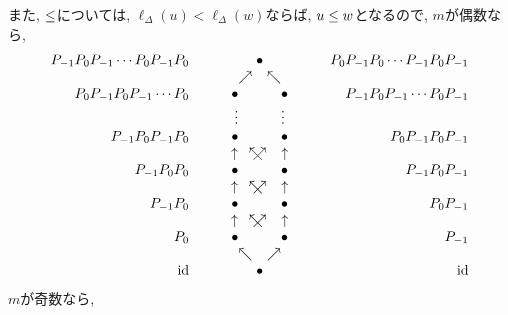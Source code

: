\newcommand{\xarrow}{\makebox[0pt][l]{$\nwarrow$}\nearrow}
また, $\mathrel{\leq}$については, $\ell_\Delta(u)<\ell_\Delta(w)$ならば, $u\mathrel{\leq} w$となるので,
$m$が偶数なら,
\begin{align*}
  \begin{array}{crcccccrc}
    &P_{-1}P_0P_{-1}\cdots P_{0}P_{-1}P_0&&&\bullet&&&P_0P_{-1}P_{0}\cdots P_{-1}P_0P_{-1}\\
    &&&&\nearrow\phantom{\bullet}\nwarrow&\\
    &P_0P_{-1}P_0P_{-1}\cdots P_{0}&&&\bullet\phantom{\nearrow\bullet\nwarrow}\bullet&&&P_{-1}P_{0}P_{-1}\cdots P_0P_{-1}\\
    &&&&\vdots\phantom{\nearrow\bullet\swarrow}\vdots\\
    &P_{-1}P_0P_{-1}P_0&&&\bullet\phantom{\nearrow\bullet\nwarrow}\bullet&&&P_{0}P_{-1}P_{0}P_{-1}\\
    &&&&\uparrow\phantom{\bullet}\xarrow\phantom{\bullet}\uparrow&\\
    &P_{-1}P_0P_0&&&\bullet\phantom{\nearrow\bullet\nwarrow}\bullet&&&P_{-1}P_0P_{-1}\\
    &&&&\uparrow\phantom{\bullet}\xarrow\phantom{\bullet}\uparrow&\\
    &P_{-1}P_0&&&\bullet\phantom{\nearrow\bullet\nwarrow}\bullet&&&P_0P_{-1}\\
    &&&&\uparrow\phantom{\bullet}\xarrow\phantom{\bullet}\uparrow&\\
    &P_0&&&\bullet\phantom{\nearrow\bullet\nwarrow}\bullet&&&P_{-1}&\\
    &&&&\nwarrow\phantom{\bullet}\nearrow&\\
    &\id &&&\bullet &&&\id
  \end{array}
\end{align*}
$m$が奇数なら,
